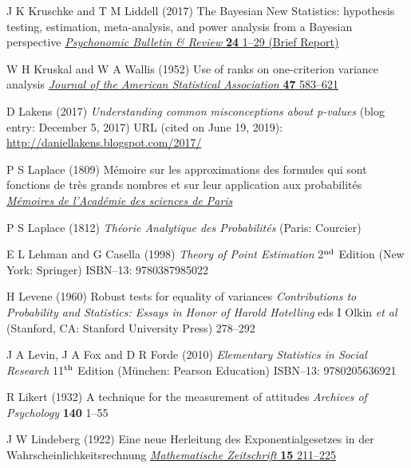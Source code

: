 \begin{thebibliography}{99}
J K Kruschke and T M Liddell (2017) The Bayesian New Statistics: 
hypothesis testing, estimation, meta-analysis, and power analysis 
from a Bayesian perspective 
\href{https://doi.org/10.3758/s13423-016-1221-4}{\textit{Psychonomic 
Bulletin \& Review} \textbf{24} 1--29 (Brief Report)}

W H Kruskal and W A Wallis
(1952) Use of ranks on one-criterion variance analysis
\href{http://www.jstor.org/stable/2280779}{\textit{Journal of the 
American Statistical Association} \textbf{47} 583--621}

D Lakens
(2017) \textit{Understanding common misconceptions about p-values}
(blog entry: December 5, 2017) URL (cited on June 19, 2019):
\href{http://daniellakens.blogspot.com/2017/}{http://daniellakens.blogspot.com/2017/}

P S Laplace
(1809) M\'{e}moire sur les approximations des formules qui sont 
fonctions de tr\`{e}s grands nombres et sur leur application aux 
probabilit\'{e}s
\href{http://gallica.bnf.fr/ark:/12148/bpt6k77600r/f306}{\textit{M\'{e}moires de l'Acad\'{e}mie des sciences de Paris}}

P S Laplace
(1812) \textit{Th\'{e}orie Analytique des Probabilit\'{e}s} (Paris: 
Courcier)

E L Lehman and G Casella
(1998) \textit{Theory of Point Estimation}
2$^{\rm nd}$ Edition
(New York: Springer) ISBN--13: 9780387985022

H Levene
(1960) Robust tests for equality of variances
\textit{Contributions to Probability and Statistics: Essays in Honor 
of Harold Hotelling} eds I Olkin \textit{et al} (Stanford, CA: 
Stanford University Press) 278--292

J A Levin, J A Fox and D R Forde
(2010) \textit{Elementary Statistics in Social Research}
11$^{\rm th}$ Edition
(M\"{u}nchen: Pearson Education) ISBN--13: 9780205636921

R Likert
(1932) A technique for the measurement of attitudes
\textit{Archives of Psychology} \textbf{140} 1--55

J W Lindeberg
(1922) Eine neue Herleitung des Exponentialgesetzes in der 
Wahrscheinlichkeitsrechnung
\href{http://dx.doi.org/10.1007/BF01494395}{\textit{Mathematische 
Zeitschrift} \textbf{15} 211--225}


\end{thebibliography}
